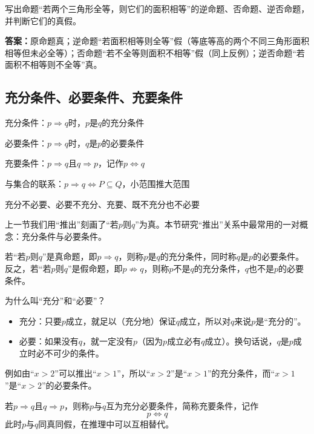 \begin{exercise}
写出命题“若两个三角形全等，则它们的面积相等”的逆命题、否命题、逆否命题，并判断它们的真假。
\end{exercise}
\textbf{答案：}原命题真；逆命题“若面积相等则全等”假（等底等高的两个不同三角形面积相等但未必全等）；否命题“若不全等则面积不相等”假（同上反例）；逆否命题“若面积不相等则不全等”真。

\clearpage
\subsection{充分条件、必要条件、充要条件}
\begin{know}
    \item 充分条件：$p\Rightarrow q$时，$p$是$q$的充分条件
    \item 必要条件：$p\Rightarrow q$时，$q$是$p$的必要条件
    \item 充要条件：$p\Rightarrow q$且$q\Rightarrow p$，记作$p\Leftrightarrow q$
    \item 与集合的联系：$p\Rightarrow q\iff P\subseteq Q$，小范围推大范围
    \item 充分不必要、必要不充分、充要、既不充分也不必要
\end{know}

上一节我们用“推出”刻画了“若$p$则$q$”为真。本节研究“推出”关系中最常用的一对概念：充分条件与必要条件。

\begin{definition}[充分条件与必要条件]
若“若$p$则$q$”是真命题，即$p\Rightarrow q$，则称$p$是$q$的充分条件，同时称$q$是$p$的必要条件。
反之，若“若$p$则$q$”是假命题，即$p\not\Rightarrow q$，则称$p$不是$q$的充分条件，$q$也不是$p$的必要条件。
\end{definition}

\begin{zhu}
为什么叫“充分”和“必要”？
\begin{itemize}
    \item 充分：只要$p$成立，就足以（充分地）保证$q$成立，所以对$q$来说$p$是“充分的”。
    \item 必要：如果没有$q$，就一定没有$p$（因为$p$成立必有$q$成立）。换句话说，$q$是$p$成立时必不可少的条件。
\end{itemize}
例如由“$x>2$”可以推出“$x>1$”，所以“$x>2$”是“$x>1$”的充分条件，而“$x>1$”是“$x>2$”的必要条件。
\end{zhu}

\begin{definition}[充要条件]
若$p\Rightarrow q$且$q\Rightarrow p$，则称$p$与$q$互为充分必要条件，简称充要条件，记作
\[p\Leftrightarrow q\]
此时$p$与$q$同真同假，在推理中可以互相替代。
\end{definition}


